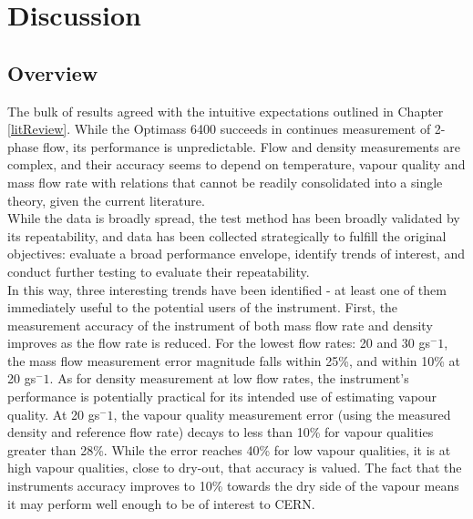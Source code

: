 \documentclass{report}
\begin{document}
\chapter{Discussion} \label{discussion}
\section{Overview}
The bulk of results agreed with the intuitive expectations outlined in Chapter \ref{litReview}. While the Optimass 6400 succeeds in continues measurement of 2-phase flow, its performance is unpredictable. Flow and density measurements are complex, and their accuracy seems to depend on temperature, vapour quality and mass flow rate with relations that cannot be readily consolidated into a single theory, given the current literature.\\
While the data is broadly spread, the test method has been broadly validated by its repeatability, and data has been collected strategically to fulfill the original objectives: evaluate a broad performance envelope, identify trends of interest, and conduct further testing to evaluate their repeatability.\\
In this way, three interesting trends have been identified - at least one of them immediately useful to the potential users of the instrument. First, the measurement accuracy of the instrument of both mass flow rate and density improves as the flow rate is reduced. For the lowest flow rates: 20 and 30 gs$^-1$, the mass flow measurement error magnitude falls within 25\%, and within 10\% at 20 gs$^-1$. As for density measurement at low flow rates, the instrument's performance is potentially practical for its intended use of estimating vapour quality. At 20 gs$^-1$, the vapour quality measurement error (using the measured density and reference flow rate)  decays to less than 10\% for vapour qualities greater than 28\%. While the error reaches 40\% for low vapour qualities, it is at high vapour qualities, close to dry-out, that accuracy is valued. The fact that the instruments accuracy improves to 10\% towards the dry side of the vapour means it may perform well enough to be of interest to CERN.\\
\end{document}
